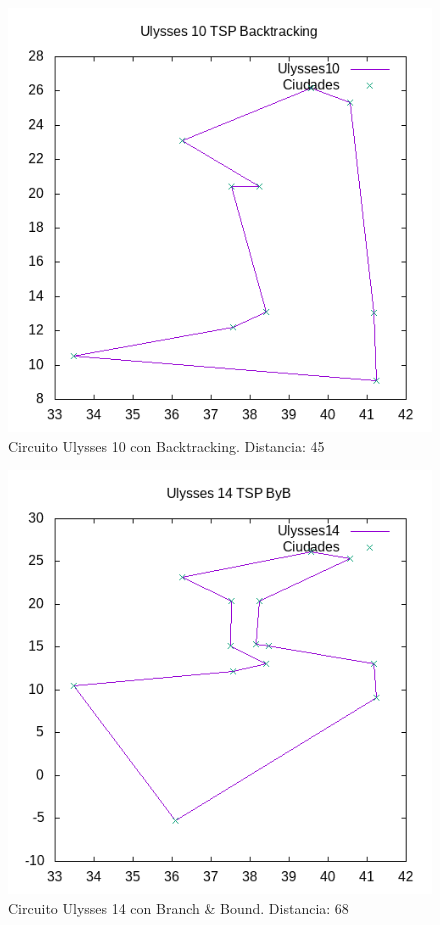 \documentclass{article}
\begin{document}
	\begin{figure}[H]
		\centering
		\includegraphics[totalheight=6cm]{ulysses10back}
		\caption{Circuito Ulysses 10 con Backtracking. Distancia: 45}
		\label{fig:u10back}
	\end{figure}

	\begin{figure}[H]
		\centering
		\includegraphics[totalheight=6cm]{ulysses14byb}
		\caption{Circuito Ulysses 14 con Branch \& Bound. Distancia: 68}
		\label{fig:u14byb}
	\end{figure}
\end{document}
